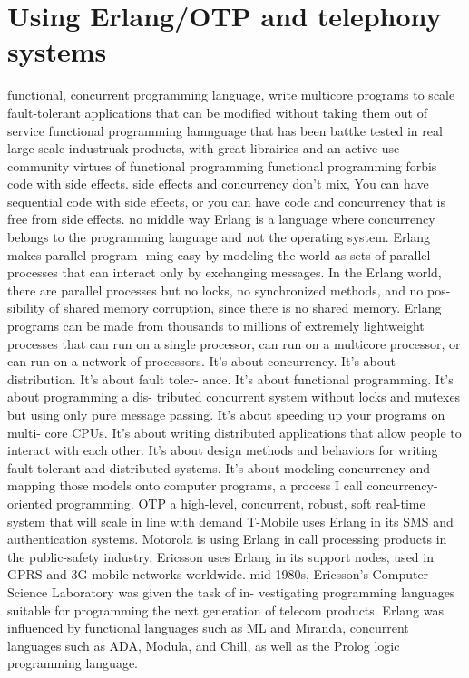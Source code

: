 \chapter{Using Erlang/OTP and telephony systems}
\label{ch:erlang}

functional, concurrent programming language,
write multicore programs to scale
fault-tolerant applications that can be modified  without taking them out of service
functional programming 
lamnguage that has been battke tested in real large scale industruak products, with great librairies and an active use community
virtues of functional programming functional programming forbis code with side effects. side effects and concurrency don't mix, You can have sequential code with side effects, or you can have code and concurrency that is free from side effects. no middle way
Erlang is a language where concurrency belongs to the programming language and not the operating system. Erlang makes parallel program- ming easy by modeling the world as sets of parallel processes that can interact only by exchanging messages. In the Erlang world, there are parallel processes but no locks, no synchronized methods, and no pos- sibility of shared memory corruption, since there is no shared memory.
Erlang programs can be made from thousands to millions of extremely lightweight processes that can run on a single processor, can run on a multicore processor, or can run on a network of processors.
It’s about concurrency. It’s about distribution. It’s about fault toler- ance. It’s about functional programming. It’s about programming a dis- tributed concurrent system without locks and mutexes but using only pure message passing. It’s about speeding up your programs on multi- core CPUs. It’s about writing distributed applications that allow people to interact with each other. It’s about design methods and behaviors for writing fault-tolerant and distributed systems. It’s about modeling concurrency and mapping those models onto computer programs, a process I call concurrency-oriented programming.
OTP
a high-level, concurrent, robust, soft real-time system that will scale in line with demand
T-Mobile uses Erlang in its SMS and authentication systems.
Motorola is using Erlang in call processing products in the public-safety industry.
Ericsson uses Erlang in its support nodes, used in GPRS and 3G mobile networks worldwide.
mid-1980s, Ericsson’s Computer Science Laboratory was given the task of in- vestigating programming languages suitable for programming the next generation of telecom products.
 Erlang was influenced by functional languages such as ML and Miranda, concurrent languages such as ADA, Modula, and Chill, as well as the Prolog logic programming language.
